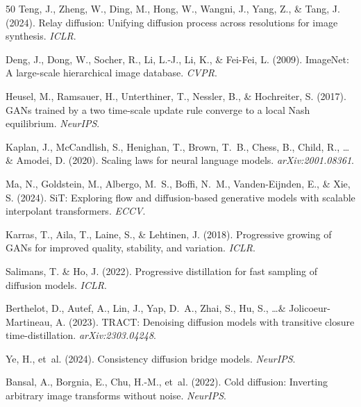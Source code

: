 \documentclass[10pt]{article}
\begin{document}
\begin{thebibliography}{50}
Teng, J., Zheng, W., Ding, M., Hong, W., Wangni, J., Yang, Z., \& Tang, J. (2024).
\newblock Relay diffusion: Unifying diffusion process across resolutions for image synthesis.
\newblock \emph{ICLR}.

Deng, J., Dong, W., Socher, R., Li, L.-J., Li, K., \& Fei-Fei, L. (2009).
\newblock ImageNet: A large-scale hierarchical image database.
\newblock \emph{CVPR}.

Heusel, M., Ramsauer, H., Unterthiner, T., Nessler, B., \& Hochreiter, S. (2017).
\newblock GANs trained by a two time-scale update rule converge to a local Nash equilibrium.
\newblock \emph{NeurIPS}.

Kaplan, J., McCandlish, S., Henighan, T., Brown, T.~B., Chess, B., Child, R., \ldots \& Amodei, D. (2020).
\newblock Scaling laws for neural language models.
\newblock \emph{arXiv:2001.08361}.

Ma, N., Goldstein, M., Albergo, M.~S., Boffi, N.~M., Vanden-Eijnden, E., \& Xie, S. (2024).
\newblock SiT: Exploring flow and diffusion-based generative models with scalable interpolant transformers.
\newblock \emph{ECCV}.

Karras, T., Aila, T., Laine, S., \& Lehtinen, J. (2018).
\newblock Progressive growing of GANs for improved quality, stability, and variation.
\newblock \emph{ICLR}.

Salimans, T. \& Ho, J. (2022).
\newblock Progressive distillation for fast sampling of diffusion models.
\newblock \emph{ICLR}.

Berthelot, D., Autef, A., Lin, J., Yap, D.~A., Zhai, S., Hu, S., \ldots \& Jolicoeur-Martineau, A. (2023).
\newblock TRACT: Denoising diffusion models with transitive closure time-distillation.
\newblock \emph{arXiv:2303.04248}.

Ye, H., et~al. (2024).
\newblock Consistency diffusion bridge models.
\newblock \emph{NeurIPS}.

Bansal, A., Borgnia, E., Chu, H.-M., et~al. (2022).
\newblock Cold diffusion: Inverting arbitrary image transforms without noise.
\newblock \emph{NeurIPS}.


\end{thebibliography}
\end{document}
